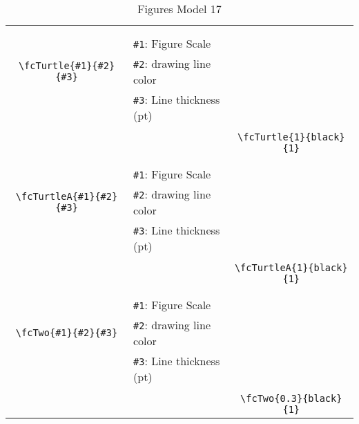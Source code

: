 \documentclass[x11names]{article}
\begin{document}
\begin{table}[H]
\begin{tabular}{|c|l|c|}
	&&\multirow{5}{*}{\fcTurtle{1}{black}{1}}\\	&&\\	&\verb|#1|: Figure Scale &\\	\verb|\fcTurtle{#1}{#2}{#3}|&	\verb|#2|: drawing line color &\\	&\verb|#3|: Line thickness (pt) &\\ &&\\&&	\verb|\fcTurtle{1}{black}{1}|\\\hline 	
	&&\multirow{5}{*}{\fcTurtleA{1}{black}{1}}\\	&&\\	&\verb|#1|: Figure Scale &\\	\verb|\fcTurtleA{#1}{#2}{#3}|&	\verb|#2|: drawing line color &\\	&\verb|#3|: Line thickness (pt) &\\ &&\\&&	\verb|\fcTurtleA{1}{black}{1}|\\\hline 	
	&&\multirow{5}{*}{\fcTwo{0.3}{black}{1}}\\	&&\\	&\verb|#1|: Figure Scale &\\	\verb|\fcTwo{#1}{#2}{#3}|&	\verb|#2|: drawing line color &\\	&\verb|#3|: Line thickness (pt) &\\ &&\\&&	\verb|\fcTwo{0.3}{black}{1}|\\\hline 	\hline\end{tabular}\caption{Figures Model 17}\label{tab17}\end{table}
\end{document}
